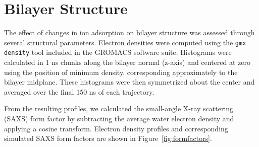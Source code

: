 \section{Bilayer Structure}
The effect of changes in ion adsorption on bilayer structure was assessed through several structural parameters. Electron densities were
computed using the \texttt{gmx density} tool included in the GROMACS software suite. Histograms were calculated in 1 ns chunks along the
bilayer normal (z-axis) and centered at zero using the position of minimum density, corresponding approximately to the bilayer midplane.
These histograms were then symmetrized about the center and averaged over the final 150 ns of each trajectory.

From the resulting profiles, we calculated the small-angle X-ray scattering (SAXS) form factor by subtracting the average water electron
density and applying a cosine transform. Electron density profiles and corresponding simulated SAXS form factors are shown in
Figure~\ref{fig:formfactors}.

